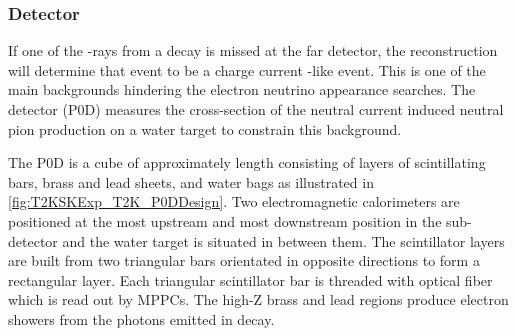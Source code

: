 \subsubsection{ Detector}
\label{subsubsec:T2KSKExp_T2K_P0D}

If one of the \quickmath{\gamma}-rays from a \quickmath{\pi^0 \rightarrow 2\gamma} decay is missed at the far detector, the reconstruction will determine that event to be a charge current -like event. This is one of the main backgrounds hindering the electron neutrino appearance searches. The  detector (P0D) measures the cross-section of the neutral current induced neutral pion production on a water target to constrain this background.

The P0D is a cube of approximately  length consisting of layers of scintillating bars, brass and lead sheets, and water bags as illustrated in \autoref{fig:T2KSKExp_T2K_P0DDesign}. Two electromagnetic calorimeters are positioned at the most upstream and most downstream position in the sub-detector and the water target is situated in between them. The scintillator layers are built from two triangular bars orientated in opposite directions to form a rectangular layer. Each triangular scintillator bar is threaded with optical fiber which is read out by MPPCs. The high-Z brass and lead regions produce electron showers from the photons emitted in  decay.

